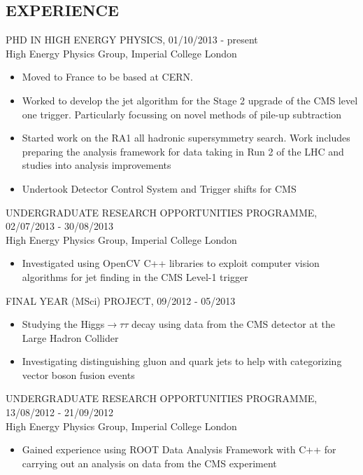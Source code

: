 \documentclass[9pt]{res} %
\begin{document}
\begin{resume}
\section{EXPERIENCE} 
\vspace{0.2cm}
PHD IN HIGH ENERGY PHYSICS, 01/10/2013 - present \\
\vspace{0.1cm}
High Energy Physics Group, Imperial College London 
   \begin{itemize} \itemsep -2pt  %
   \item Moved to France to be based at CERN. 
   \item Worked to develop the jet algorithm for the Stage 2 upgrade of the CMS level one trigger. Particularly focussing on novel methods of pile-up subtraction
   \item Started work on the RA1 all hadronic supersymmetry search. Work includes preparing the analysis framework for data taking in Run 2 of the LHC and studies into analysis improvements
   \item Undertook Detector Control System and Trigger shifts for CMS
 \end{itemize}

UNDERGRADUATE RESEARCH OPPORTUNITIES PROGRAMME, 02/07/2013 - 30/08/2013 \\
\vspace{0.1cm}
High Energy Physics Group, Imperial College London 
   \begin{itemize} \itemsep -2pt  %
   \item Investigated using OpenCV C++ libraries to exploit computer vision algorithms for jet finding in the CMS Level-1 trigger
 \end{itemize}

FINAL YEAR (MSci) PROJECT, 09/2012 - 05/2013
\vspace{0.1cm}
   \begin{itemize}\itemsep -2pt  %
   \item Studying the Higgs$\rightarrow\tau\tau$ decay using data from the CMS detector at 
   the Large Hadron Collider
   \item Investigating distinguishing gluon and quark jets to help with categorizing vector boson fusion events
   \end{itemize}

UNDERGRADUATE RESEARCH OPPORTUNITIES PROGRAMME, 13/08/2012 - 21/09/2012 \\
\vspace{0.1cm}
High Energy Physics Group, Imperial College London 
   \begin{itemize} \itemsep -2pt  %
   \item Gained experience using ROOT Data Analysis Framework with C++ for carrying out an analysis on data from the CMS experiment
 \end{itemize}


\end{resume}
\end{document}
